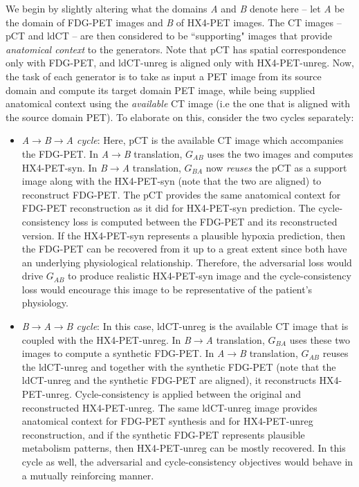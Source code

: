 We begin by slightly altering what the domains \textit{A} and \textit{B} denote here -- let \textit{A} be the domain of FDG-PET images and \textit{B} of HX4-PET images. The CT images -- pCT and ldCT -- are then considered to be ``supporting" images that provide \textit{anatomical context} to the generators. Note that pCT has spatial correspondence only with FDG-PET, and ldCT-unreg is aligned only with HX4-PET-unreg. Now, the task of each generator is to take as input a PET image from its source domain and compute its target domain PET image, while being supplied anatomical context using the \textit{available} CT image (i.e the one that is aligned with the source domain PET). To elaborate on this, consider the two cycles separately: 

\begin{itemize}
    \item \textit{A$\rightarrow$B$\rightarrow$A cycle}: Here, pCT is the available CT image which accompanies the FDG-PET. In \textit{A}$\rightarrow$\textit{B} translation, $G_{AB}$ uses the two images and computes HX4-PET-syn. In \textit{B}$\rightarrow$\textit{A} translation, $G_{BA}$ now \textit{reuses} the pCT as a support image along with the HX4-PET-syn (note that the two are aligned) to reconstruct FDG-PET. The pCT provides the same anatomical context for FDG-PET reconstruction as it did for HX4-PET-syn prediction. The cycle-consistency loss is computed between the FDG-PET and its reconstructed version. If the HX4-PET-syn represents a plausible hypoxia prediction, then the FDG-PET can be recovered from it up to a great extent since both have an underlying physiological relationship. Therefore, the adversarial loss would drive $G_{AB}$ to produce realistic HX4-PET-syn image and the cycle-consistency loss would encourage this image to be representative of the patient's physiology. 
    
    \item \textit{B$\rightarrow$A$\rightarrow$B cycle}: In this case, ldCT-unreg is the available CT image that is coupled with the HX4-PET-unreg. In \textit{B}$\rightarrow$\textit{A} translation, $G_{BA}$ uses these two images to compute a synthetic FDG-PET. In \textit{A}$\rightarrow$\textit{B} translation, $G_{AB}$ reuses the ldCT-unreg and together with the synthetic FDG-PET (note that the ldCT-unreg and the synthetic FDG-PET are aligned), it reconstructs HX4-PET-unreg. Cycle-consistency is applied between the original and reconstructed HX4-PET-unreg. The same ldCT-unreg image provides anatomical context for FDG-PET synthesis and for HX4-PET-unreg reconstruction, and if the synthetic FDG-PET represents plausible metabolism patterns, then HX4-PET-unreg can be mostly recovered. In this cycle as well, the adversarial and cycle-consistency objectives would behave in a mutually reinforcing manner.
\end{itemize}

